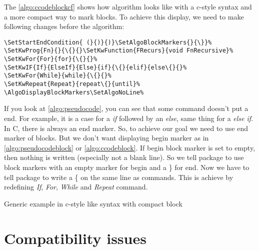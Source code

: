 \documentclass[a4paper]{article}
\begin{document}
The \autoref{algo:ccodeblockcf} shows how algorithm looks like with a c-style
syntax and a more compact way to mark blocks. To achieve this display, we need to make following changes before the algorithm:\vspace{-1.5ex}
\begin{verbatim}
\SetStartEndCondition{ (}{)}{)}\SetAlgoBlockMarkers{}{\}}%
\SetKwProg{Fn}{}{\{}{}\SetKwFunction{FRecurs}{void FnRecursive}%
\SetKwFor{For}{for}{\{}{}%
\SetKwIF{If}{ElseIf}{Else}{if}{\{}{elif}{else\{}{}%
\SetKwFor{While}{while}{\{}{}%
\SetKwRepeat{Repeat}{repeat\{}{until}%
\AlgoDisplayBlockMarkers\SetAlgoNoLine%
\end{verbatim}
\vspace{-1.5ex} If you look at \autoref{algo:pseudocode}, you can see that some command
doesn't put a end. For example, it is a case for a \emph{if} followed by an \emph{else},
same thing for a \emph{else if}. In C, there is always an end marker. So, to achieve our
goal we need to use end marker of blocks. But we don't want displaying begin marker as in
\autoref{algo:pseudocodeblock} or \autoref{algo:ccodeblock}. If begin block marker is set to
empty, then nothing is written (especially not a blank line). So we tell package to use
block markers with an empty marker for begin and a \} for end. Now we have to tell package
to write a \{ on the same line as commands. This is achieve by redefining \emph{If},
\emph{For}, \emph{While} and \emph{Repeat} command.
\begin{algorithm}\AlgoDisplayBlockMarkers\SetAlgoLongEnd\SetAlgoNoLine%
  \SetStartEndCondition{ (}{)}{)}\SetAlgoBlockMarkers{}{\}}%
  \caption{Generic example in c-style like syntax with compact block}\label{algo:ccodeblockcf}
  
\end{algorithm}


\section{Compatibility issues}
\end{document}
